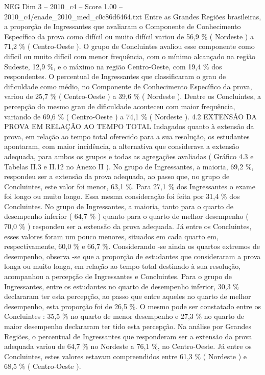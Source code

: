 \begin{textsample}{NEG Dim 3 – 2010\_c4 – Score 1.00 – 2010\_c4/enade\_2010\_med\_c0c86d6464.txt}
Entre as Grandes Regiões brasileiras, a proporção de Ingressantes que avaliaram o Componente de Conhecimento Específico da prova como difícil ou muito difícil variou de 56,9 \% ( Nordeste ) a 71,2 \% ( Centro-Oeste ).
O grupo de Concluintes avaliou esse componente como difícil ou muito difícil com menor frequência, com o mínimo alcançado na região Sudeste, 12,9 \%, e o máximo na região Centro-Oeste, com 19,4 \% dos respondentes.
O percentual de Ingressantes que classificaram o grau de dificuldade como médio, no Componente de Conhecimento Específico da prova, variou de 25,7 \% ( Centro-Oeste ) a 39,6 \% ( Nordeste ).
Dentre os Concluintes, a percepção do mesmo grau de dificuldade aconteceu com maior frequência, variando de 69,6 \% ( Centro-Oeste ) a 74,1 \% ( Nordeste ). 4.2 EXTENSÃO DA PROVA EM RELAÇÃO AO TEMPO TOTAL Indagados quanto à extensão da prova, em relação ao tempo total oferecido para a sua resolução, os estudantes apontaram, com maior incidência, a alternativa que considerava a extensão adequada, para ambos os grupos e todas as agregações avaliadas ( Gráfico 4.3 e Tabelas II.3 e II.12 no Anexo II ).
No grupo de Ingressantes, a maioria, 69,2 \%, respondeu ser a extensão da prova adequada, ao passo que, no grupo de Concluintes, este valor foi menor, 63,1 \%.
Para 27,1 \% dos Ingressantes o exame foi longo ou muito longo.
Essa mesma consideração foi feita por 31,4 \% dos Concluintes.
No grupo de Ingressantes, a maioria, tanto para o quarto de desempenho inferior ( 64,7 \% ) quanto para o quarto de melhor desempenho ( 70,0 \% ) respondeu ser a extensão da prova adequada.
Já entre os Concluintes, esses valores foram um pouco menores, situados em cada quarto em, respectivamente, 60,0 \% e 66,7 \%.
Considerando -se ainda os quartos extremos de desempenho, observa -se que a proporção de estudantes que consideraram a prova longa ou muito longa, em relação ao tempo total destinado à sua resolução, acompanhou a percepção de Ingressantes e Concluintes.
Para o grupo de Ingressantes, entre os estudantes no quarto de desempenho inferior, 30,3 \% declararam ter esta percepção, ao passo que entre aqueles no quarto de melhor desempenho, esta proporção foi de 26,5 \%.
O mesmo pode ser constatado entre os Concluintes : 35,5 \% no quarto de menor desempenho e 27,3 \% no quarto de maior desempenho declararam ter tido esta percepção.
Na análise por Grandes Regiões, o percentual de Ingressantes que responderam ser a extensão da prova adequada variou de 64,7 \% no Nordeste a 76,1 \%, no Centro-Oeste.
Já entre os Concluintes, estes valores estavam compreendidos entre 61,3 \% ( Nordeste ) e 68,5 \% ( Centro-Oeste ).

\end{textsample}
